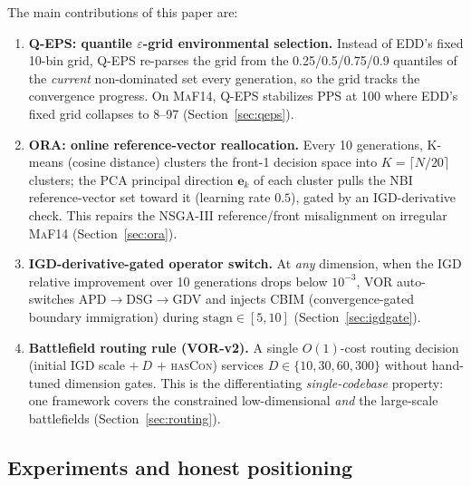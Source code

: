 \documentclass[preprint,12pt]{elsarticle}
\begin{document}
The main contributions of this paper are:
\begin{enumerate}
\item \textbf{\textsc{Q-EPS}: quantile $\varepsilon$-grid
environmental selection.}
Instead of EDD's fixed 10-bin grid, \textsc{Q-EPS}
re-parses the grid from the 0.25/0.5/0.75/0.9 quantiles
of the \emph{current} non-dominated set every generation, so the
grid tracks the convergence progress.
On \textsc{MaF14}, \textsc{Q-EPS} stabilizes PPS at 100 where
EDD's fixed grid collapses to 8--97 (Section~\ref{sec:qeps}).
\item \textbf{\textsc{ORA}: online reference-vector reallocation.}
Every 10 generations, K-means (cosine distance) clusters the
front-1 decision space into $K=\lceil N/20\rceil$ clusters; the PCA
principal direction $\mathbf{e}_k$ of each cluster pulls the NBI
reference-vector set toward it (learning rate $0.5$), gated by an
IGD-derivative check. This repairs the NSGA-III reference/front
misalignment on irregular \textsc{MaF14} (Section~\ref{sec:ora}).
\item \textbf{IGD-derivative-gated operator switch.} At \emph{any}
dimension, when the IGD relative improvement over 10 generations drops
below $10^{-3}$, VOR auto-switches APD$\to$DSG$\to$GDV and injects
\textsc{CBIM} (convergence-gated boundary immigration) during
$\mathrm{stagn}\in[5,10]$ (Section~\ref{sec:igdgate}).
\item \textbf{Battlefield routing rule (VOR-v2).}
A single $O(1)$-cost routing decision
(initial IGD scale $+~D$ $+$ \textsc{hasCon})
services $D\in\{10,30,60,300\}$ without hand-tuned dimension
gates. This is the differentiating \emph{single-codebase}
property: one framework covers the constrained
low-dimensional \emph{and} the large-scale battlefields
(Section~\ref{sec:routing}).
\end{enumerate}

\subsection{Experiments and honest positioning}
\end{document}
